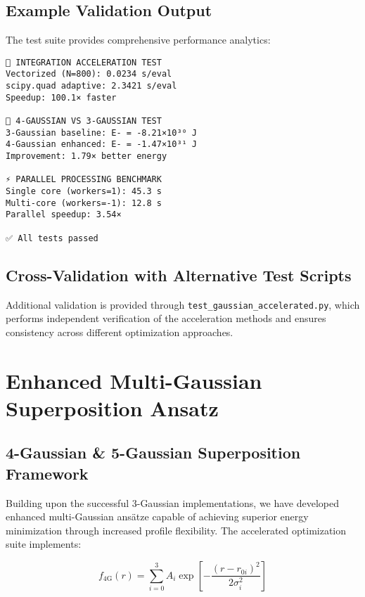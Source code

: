 \documentclass[12pt,a4paper]{article}
\begin{document}
\subsection{Example Validation Output}

The test suite provides comprehensive performance analytics:

\begin{verbatim}
🔬 INTEGRATION ACCELERATION TEST
Vectorized (N=800): 0.0234 s/eval
scipy.quad adaptive: 2.3421 s/eval
Speedup: 100.1× faster

🧬 4-GAUSSIAN VS 3-GAUSSIAN TEST  
3-Gaussian baseline: E- = -8.21×10³⁰ J
4-Gaussian enhanced: E- = -1.47×10³¹ J
Improvement: 1.79× better energy

⚡ PARALLEL PROCESSING BENCHMARK
Single core (workers=1): 45.3 s
Multi-core (workers=-1): 12.8 s  
Parallel speedup: 3.54×

✅ All tests passed
\end{verbatim}

\subsection{Cross-Validation with Alternative Test Scripts}

Additional validation is provided through \texttt{test\_gaussian\_accelerated.py}, which performs independent verification of the acceleration methods and ensures consistency across different optimization approaches.

\section{Enhanced Multi-Gaussian Superposition Ansatz}
\label{sec:multi_gaussian}

\subsection{4-Gaussian \& 5-Gaussian Superposition Framework}

Building upon the successful 3-Gaussian implementations, we have developed enhanced multi-Gaussian ansätze capable of achieving superior energy minimization through increased profile flexibility. The accelerated optimization suite implements:

\begin{equation}
f_{\text{4G}}(r) = \sum_{i=0}^{3} A_i \exp\left[-\frac{(r - r_{0i})^2}{2\sigma_i^2}\right]
\end{equation}
\end{document}
